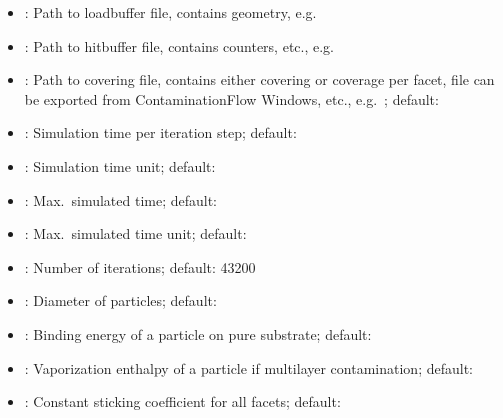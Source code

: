 \begin{itemize}[noitemsep,topsep=0pt, partopsep=0pt]
\item {}: Path to loadbuffer file, contains geometry, e.g.\ 
\item {}: Path to hitbuffer file, contains counters, etc., e.g.\ 
\item {}: Path to covering file, contains either covering or coverage per facet, file can be exported from ContaminationFlow Windows, etc., e.g.\ ; default: 
\item {}: Simulation time per iteration step; default: 
\item {}: Simulation time unit; default: 
\item {}: Max.\ simulated time; default: 
\item {}: Max.\ simulated time unit; default: 
\item {}: Number of iterations; default: 43200
\item {}: Diameter of particles; default:
\item {}: Binding energy of a particle on pure substrate; default:
\item {}: Vaporization enthalpy of a particle if multilayer contamination; default:
\item {}: Constant sticking coefficient for all facets; default:

\end{itemize}
